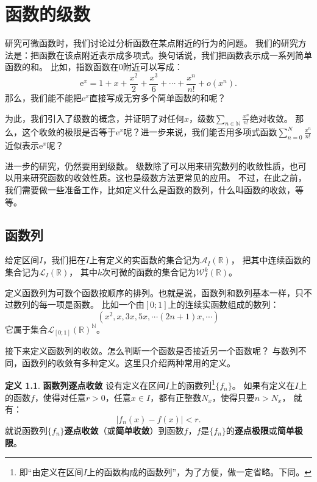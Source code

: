 \documentclass[12pt,UTF8]{ctexbook}
\newcommand{\olim}[1]{\mathit{o}\left(#1\right)}  %
\theoremstyle{definition}
\newtheorem{df}{定义}[section]
\theoremstyle{plain}
\begin{document}
\chapter{函数的级数}

研究可微函数时，我们讨论过分析函数在某点附近的行为的问题。
我们的研究方法是：把函数在该点附近表示成多项式。换句话说，我们把函数表示成一系列简单函数的和。
比如，指数函数在$0$附近可以写成：
$$\mathrm{e}^x = 1 + x + \frac{x^2}{2} + \frac{x^3}{6} + \cdots + \frac{x^n}{n!} + \olim{x^n}.$$
那么，我们能不能把$\mathrm{e}^x$直接写成无穷多个简单函数的和呢？

为此，我们引入了级数的概念，并证明了对任何$x$，级数$\sum_{n\in\mathbb{N}}\frac{x^{n}}{n!}$绝对收敛。
那么，这个收敛的极限是否等于$\mathrm{e}^x$呢？进一步来说，我们能否用多项式函数$\sum_{n=0}^N\frac{x^{n}}{n!}$
近似表示$\mathrm{e}^x$呢？

进一步的研究，仍然要用到级数。
级数除了可以用来研究数列的收敛性质，也可以用来研究函数的收敛性质。这也是级数方法更常见的应用。
不过，在此之前，我们需要做一些准备工作，比如定义什么是函数的数列，什么叫函数的收敛，等等。

\section{函数列}

给定区间$I$，我们把在$I$上有定义的实函数的集合记为$\mathcal{A}_I(\mathbb{R})$，
把其中连续函数的集合记为$\mathcal{L}_I(\mathbb{R})$，
其中$k$次可微的函数的集合记为$\mathcal{W}_I^k(\mathbb{R})$。

定义函数列为可数个函数按顺序的排列。也就是说，函数列和数列基本一样，只不过数列的每一项是函数。
比如一个由$[0;1]$上的连续实函数组成的数列：
$$ (x^2, x, 3x, 5x, \cdots (2n+1)x, \cdots )$$
它属于集合$\mathcal{L}_{[0;1]}(\mathbb{R})^{\mathbb{N}}$。

接下来定义函数列的收敛。怎么判断一个函数是否接近另一个函数呢？
与数列不同，函数列的收敛有多种定义。这里只介绍两种常用的定义。
\begin{df}{\textbf{函数列逐点收敛}}
    设有定义在区间$I$上的函数列\footnote{即“由定义在区间$I$上的函数构成的函数列”，为了方便，做一定省略。下同。}$\{f_n\}$。
    如果有定义在$I$上的函数$f$，使得对任意$r>0$，任意$x\in I$，都有正整数$N_x$，使得只要$n>N_x$，
    就有：
    $$ |f_n(x) - f(x) | < r.$$
    就说函数列$\{f_n\}$\textbf{逐点收敛}（或\textbf{简单收敛}）到函数$f$，$f$是$\{f_n\}$的\textbf{逐点极限}或\textbf{简单极限}。
\end{df}
\end{document}

